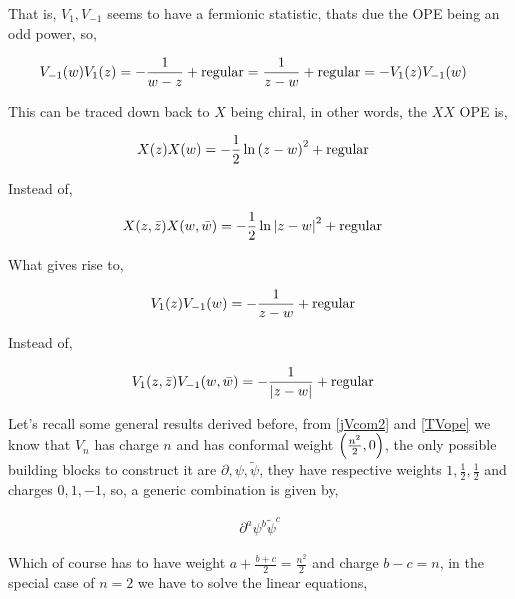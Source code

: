 That is, $V_1,V_{-1}$ seems to have a fermionic statistic, thats due the OPE being an odd power, so,

\begin{align*}
    V_{-1}\qty(w)V_{1}\qty(z)&=-\frac{1}{w-z}+\textnormal{regular}=\frac{1}{z-w}+\textnormal{regular}=-V_1\qty(z)V_{-1}\qty(w)
\end{align*}

This can be traced down back to $X$ being chiral, in other words, the $XX$ OPE is,

\begin{align*}
    X\qty(z)X\qty(w)&=-\frac12\ln\qty(z-w)^2+\textnormal{regular}
\end{align*}

Instead of,

\begin{align*}
    X\qty(z,\bar z)X\qty(w,\bar w)&=-\frac12\ln\abs{z-w}^2+\textnormal{regular}
\end{align*}

What gives rise to,

\begin{align*}
    V_1\qty(z)V_{-1}\qty(w)&=-\frac{1}{z-w}+\textnormal{regular}
\end{align*}

Instead of,

\begin{align*}
    V_1\qty(z,\bar z)V_{-1}\qty(w,\bar w)&=-\frac{1}{\abs{z-w}}+\textnormal{regular}
\end{align*}

\probitem{}

Let's recall some general results derived before, from \ref{jVcom2} and \ref{TVope} we know that $V_n$ has 
charge $n$ and has conformal weight $\qty(\frac{n^2}{2},0)$, the only possible building blocks to construct it 
are $\partial,\psi,\tilde\psi$, they have respective weights $1,\frac12,\frac12$ and charges $0,1,-1$, so, a generic 
combination is given by,

\begin{align*}
    \partial^a\psi^b{\tilde\psi}^c
\end{align*}

Which of course has to have weight $a+\frac{b+c}{2}=\frac{n^2}{2}$ and charge $b-c=n$, in the special case of $n=2$ we have 
to solve the linear equations,

